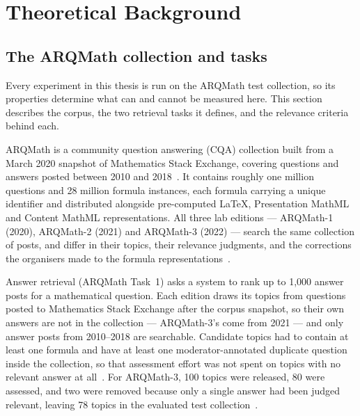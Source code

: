 \chapter{Theoretical Background}\label{ch:background}

\section{The ARQMath collection and tasks}\label{sec:bg-arqmath}

Every experiment in this thesis is run on the ARQMath test collection, so its
properties determine what can and cannot be measured here. This section describes
the corpus, the two retrieval tasks it defines, and the relevance criteria behind
each.

ARQMath is a community question answering (CQA) collection built from a March
2020 snapshot of Mathematics Stack Exchange, covering questions and answers
posted between 2010 and 2018~\cite{zanibbi2020arqmath}. It contains roughly
one million questions and 28 million formula instances, each formula carrying
a unique identifier and distributed alongside pre-computed \LaTeX{},
Presentation MathML and Content MathML representations. All three lab editions
--- ARQMath-1 (2020), ARQMath-2 (2021) and ARQMath-3 (2022) --- search the same
collection of posts, and differ in their topics, their relevance judgments, and the
corrections the organisers made to the formula
representations~\cite{mansouri2022arqmath3}.

Answer retrieval (ARQMath Task~1) asks a system to rank up to 1{,}000 answer
posts for a mathematical question. Each edition draws its topics from questions
posted to Mathematics Stack Exchange after the corpus snapshot, so their own
answers are not in the collection --- ARQMath-3's come from 2021 --- and only
answer posts from 2010--2018 are searchable. Candidate topics had to contain at
least one formula and have at least one moderator-annotated duplicate question
inside the collection, so that assessment effort was not spent on topics with no
relevant answer at all~\cite{mansouri2022arqmath3}. For ARQMath-3, 100 topics
were released, 80 were assessed, and two were removed because only a single
answer had been judged relevant, leaving 78 topics in the evaluated test
collection~\cite{mansouri2022arqmath3}.

